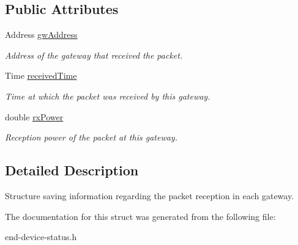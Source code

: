 \subsection*{Public Attributes}
\begin{DoxyCompactItemize}
\item 
\mbox{\label{structns3_1_1lorawan_1_1EndDeviceStatus_1_1PacketInfoPerGw_ad22085c859488531165727f5707ef0e5}} 
Address \hyperlink{structns3_1_1lorawan_1_1EndDeviceStatus_1_1PacketInfoPerGw_ad22085c859488531165727f5707ef0e5}{gw\+Address}
\begin{DoxyCompactList}\small\item\em Address of the gateway that received the packet. \end{DoxyCompactList}\item 
\mbox{\label{structns3_1_1lorawan_1_1EndDeviceStatus_1_1PacketInfoPerGw_a3a492ecebce086a55571975f0b123fcd}} 
Time \hyperlink{structns3_1_1lorawan_1_1EndDeviceStatus_1_1PacketInfoPerGw_a3a492ecebce086a55571975f0b123fcd}{received\+Time}
\begin{DoxyCompactList}\small\item\em Time at which the packet was received by this gateway. \end{DoxyCompactList}\item 
\mbox{\label{structns3_1_1lorawan_1_1EndDeviceStatus_1_1PacketInfoPerGw_ad85cad73c3645edcdb4ce04e850a7983}} 
double \hyperlink{structns3_1_1lorawan_1_1EndDeviceStatus_1_1PacketInfoPerGw_ad85cad73c3645edcdb4ce04e850a7983}{rx\+Power}
\begin{DoxyCompactList}\small\item\em Reception power of the packet at this gateway. \end{DoxyCompactList}\end{DoxyCompactItemize}


\subsection{Detailed Description}
Structure saving information regarding the packet reception in each gateway. 

The documentation for this struct was generated from the following file\+:\begin{DoxyCompactItemize}
\item 
end-\/device-\/status.\+h\end{DoxyCompactItemize}
